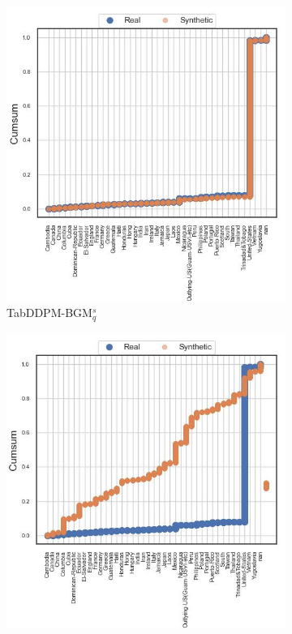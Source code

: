 \begin{figure}[H]
	\begin{subfigure}{0.3\textwidth}
		\centering
		\includegraphics[width=\textwidth]{images/cdf/tab-ddpm-bgm-simTune.jpg}
		\caption{TabDDPM-BGM$^{s}_q$}
	\end{subfigure}
	\begin{subfigure}{0.3\textwidth}
		\centering
		\includegraphics[width=\textwidth]{images/cdf/tab-ddpm-ft.jpg}

\end{subfigure}
\end{figure}
